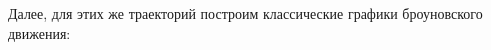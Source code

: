 \documentclass[14pt,a4paper]{scrartcl}
\begin{document}
Далее, для этих же траекторий построим классические графики броуновского движения:
\begin{figure}[H]
	\begin{minipage}[h]{.7\linewidth}
		 \\
	\end{minipage}
	\begin{minipage}[h]{.7\linewidth}
		 \\
	\end{minipage}
	\begin{minipage}[h]{.7\linewidth}
		  \\

\end{minipage}
\end{figure}
\end{document}
